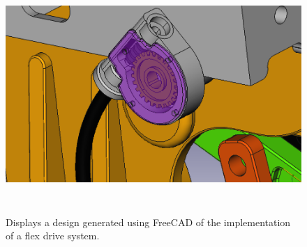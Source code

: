 \documentclass[paper=a4, fontsize=11pt]{scrartcl}
\numberwithin{equation}{section}		%
\numberwithin{figure}{section}			%
\numberwithin{table}{section}				%
\begin{document}
        \begin{figure}[H]
                \includegraphics[height=9cm]{newurm3}
                \caption{Displays a design generated using FreeCAD of the implementation of a flex drive system.}
                \label{con2}
        \end{figure}
        
\end{document}
